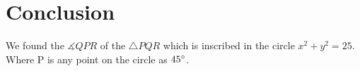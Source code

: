 \documentclass[journal,12pt,twocolumn]{article}
\begin{document}
\section{Conclusion}
\begin{center}
We found the  $ \measuredangle{QPR} $ of the $\triangle{PQR}$ which is inscribed in the circle $x^2 + y^2 = 25$. Where P is any point on the circle as $45\degree$.
\end{center}
\end{document}
